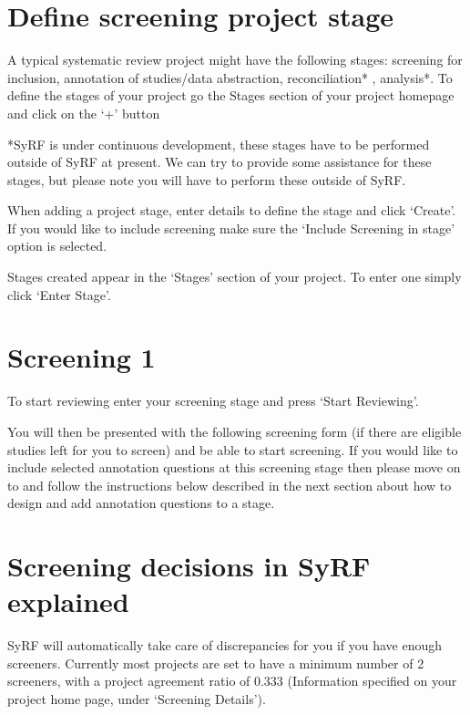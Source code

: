 \documentclass[
]{book}
\begin{document}
\hypertarget{define-screening-project-stage}{%
\section{Define screening project stage}\label{define-screening-project-stage}}

A typical systematic review project might have the following stages: screening for inclusion, annotation of studies/data abstraction, reconciliation* , analysis*.
To define the stages of your project go the Stages section of your project homepage and click on the `+' button

*SyRF is under continuous development, these stages have to be performed outside of SyRF at present. We can try to provide some assistance for these stages, but please note you will have to perform these outside of SyRF.

When adding a project stage, enter details to define the stage and click `Create'. If you would like to include screening make sure the `Include Screening in stage' option is selected.

Stages created appear in the `Stages' section of your project. To enter one simply click `Enter Stage'.

\hypertarget{screening-1}{%
\section{Screening 1}\label{screening-1}}

To start reviewing enter your screening stage and press `Start Reviewing'.

You will then be presented with the following screening form (if there are eligible studies left for you to screen) and be able to start screening. If you would like to include selected annotation questions at this screening stage then please move on to and follow the instructions below described in the next section about how to design and add annotation questions to a stage.

\hypertarget{screening-decisions-in-syrf-explained}{%
\section{Screening decisions in SyRF explained}\label{screening-decisions-in-syrf-explained}}

SyRF will automatically take care of discrepancies for you if you have enough screeners. Currently most projects are set to have a minimum number of 2 screeners, with a project agreement ratio of 0.333 (Information specified on your project home page, under `Screening Details').
\end{document}
